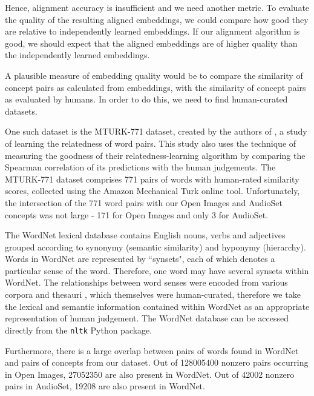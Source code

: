 Hence, alignment accuracy is insufficient and we need another metric. To evaluate the quality of the resulting aligned embeddings, we could compare how good they are relative to independently learned embeddings. If our alignment algorithm is good, we should expect that the aligned embeddings are of higher quality than the independently learned embeddings. 

A plausible measure of embedding quality would be to compare the similarity of concept pairs as calculated from embeddings, with the similarity of concept pairs as evaluated by humans. In order to do this, we need to find human-curated datasets.

One such dataset is the MTURK-771 dataset, created by the authors of \cite{mturk771}, a study of learning the relatedness of word pairs. This study also uses the technique of measuring the goodness of their relatedness-learning algorithm by comparing the Spearman correlation of its predictions with the human judgements. The MTURK-771 dataset comprises 771 pairs of words with human-rated similarity scores, collected using the Amazon Mechanical Turk online tool. Unfortunately, the intersection of the 771 word pairs with our Open Images and AudioSet concepts was not large - 171 for Open Images and only 3 for AudioSet. 

The WordNet \cite{WordNet} lexical database contains English nouns, verbs and adjectives grouped according to synonymy (semantic similarity) and hyponymy (hierarchy). Words in WordNet are represented by ``synsets", each of which denotes a particular sense of the word. Therefore, one word may have several synsets within WordNet. The relationships between word senses were encoded from various corpora and thesauri , which themselves were human-curated, therefore we take the lexical and semantic information contained within WordNet as an appropriate representation of human judgement. The WordNet database can be accessed directly from the \texttt{nltk} Python package. 

Furthermore, there is a large overlap between pairs of words found in WordNet and pairs of concepts from our dataset.  Out of 128005400 nonzero pairs occurring in Open Images, 27052350 are also present in WordNet. Out of 42002 nonzero pairs in AudioSet, 19208 are also present in WordNet. 

